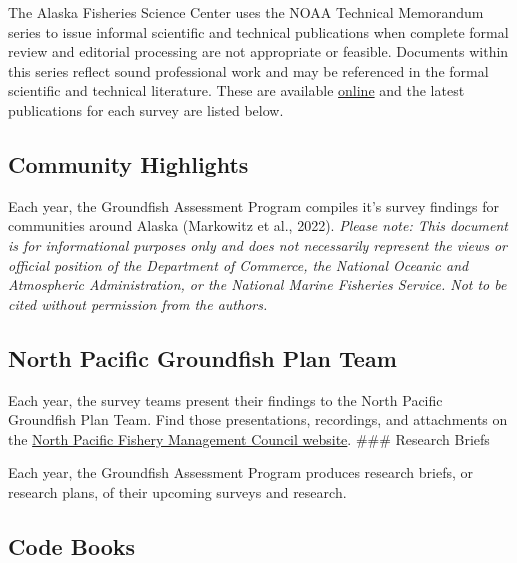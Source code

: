 \documentclass[
  letterpaper,
  oneside,
  open=any]{scrbook}
\begin{document}
The Alaska Fisheries Science Center uses the NOAA Technical Memorandum
series to issue informal scientific and technical publications when
complete formal review and editorial processing are not appropriate or
feasible. Documents within this series reflect sound professional work
and may be referenced in the formal scientific and technical literature.
These are available \href{https://repository.library.noaa.gov/}{online}
and the latest publications for each survey are listed below.

\hypertarget{community-highlights}{%
\subsection*{Community Highlights}\label{community-highlights}}

Each year, the Groundfish Assessment Program compiles it's survey
findings for communities around Alaska (Markowitz et al., 2022).
\emph{Please note: This document is for informational purposes only and
does not necessarily represent the views or official position of the
Department of Commerce, the National Oceanic and Atmospheric
Administration, or the National Marine Fisheries Service. Not to be
cited without permission from the authors. }

\hypertarget{north-pacific-groundfish-plan-team}{%
\subsection*{North Pacific Groundfish Plan
Team}\label{north-pacific-groundfish-plan-team}}

Each year, the survey teams present their findings to the North Pacific
Groundfish Plan Team. Find those presentations, recordings, and
attachments on the
\href{https://www.npfmc.org/about-the-council/plan-teams/bsai-and-goa-groundfish/}{North
Pacific Fishery Management Council website}. \#\#\# Research Briefs

Each year, the Groundfish Assessment Program produces research briefs,
or research plans, of their upcoming surveys and research.

\hypertarget{code-books}{%
\subsection*{Code Books}\label{code-books}}
\end{document}
